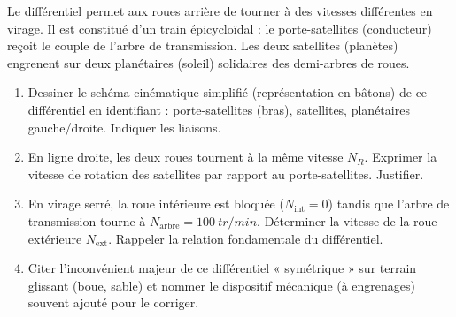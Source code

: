 \documentclass[11pt]{article}
\begin{document}
\begin{exercice}
Le différentiel permet aux roues arrière de tourner à des vitesses différentes en virage. Il est constitué d'un train épicycloïdal : le porte-satellites (conducteur) reçoit le couple de l'arbre de transmission. Les deux satellites (planètes) engrenent sur deux planétaires (soleil) solidaires des demi-arbres de roues.
\begin{enumerate}
    \item Dessiner le schéma cinématique simplifié (représentation en bâtons) de ce différentiel en identifiant : porte-satellites (bras), satellites, planétaires gauche/droite. Indiquer les liaisons.
    \item En ligne droite, les deux roues tournent à la même vitesse $N_R$. Exprimer la vitesse de rotation des satellites par rapport au porte-satellites. Justifier.
    \item En virage serré, la roue intérieure est bloquée ($N_{\text{int}} = 0$) tandis que l'arbre de transmission tourne à $N_{\text{arbre}} = \SI{100}{tr/min}$. Déterminer la vitesse de la roue extérieure $N_{\text{ext}}$. Rappeler la relation fondamentale du différentiel.
    \item Citer l'inconvénient majeur de ce différentiel « symétrique » sur terrain glissant (boue, sable) et nommer le dispositif mécanique (à engrenages) souvent ajouté pour le corriger.
\end{enumerate}
\end{exercice}
\end{document}
